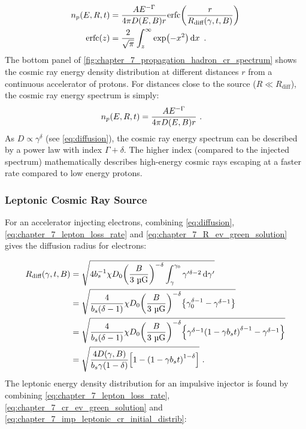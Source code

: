 \begin{equation}
    \begin{aligned}
    n_p\qty(E,R,t)&=\frac{AE^{-\Gamma}}{4\pi D\qty(E,B)r}\text{erfc}\qty(\frac{r}{R_\text{diff}\qty(\gamma,t,B)}) \\
    \text{erfc}\qty(z)&=\frac{2}{\sqrt{\pi}}\int_z^\infty \exp(-x^2)\dd{x}\text{ .}
    \end{aligned} \label{eq:chapter_7_crpropev_hadronic_continuous}
\end{equation}
\noindent The bottom panel of \autoref{fig:chapter_7_propagation_hadron_cr_spectrum} shows the cosmic ray energy density distribution at different distances $r$ from a continuous accelerator of protons. For distances close to the source ($R\ll R_\text{diff}$), the cosmic ray energy spectrum is simply:
\begin{equation}
    \begin{aligned}
 	   n_p\qty(E,R,t)&=\frac{AE^{-\Gamma}}{4\pi D\qty(E,B)r}\text{ .}
    \end{aligned} 
\end{equation}
\noindent As $D\propto \gamma^{\delta}$ (see \autoref{eq:diffusion}), the cosmic ray energy spectrum can be described by a power law with index $\Gamma+\delta$. The higher index (compared to the injected spectrum) mathematically describes high-energy cosmic rays escaping at a faster rate compared to low energy protons.

\subsubsection{Leptonic Cosmic Ray Source}

For an accelerator injecting electrons, combining \autoref{eq:diffusion},  \autoref{eq:chapter_7_lepton_loss_rate} and \autoref{eq:chapter_7_R_ev_green_solution} gives the diffusion radius for electrons:

\begin{equation}
	\begin{aligned}
		R_\text{diff}\qty(\gamma,t,B)&=\sqrt{4b_s^{-1} \chi D_0\qty(\frac{B}{3~\si{\micro G}})^{-\delta}\int_\gamma^{\gamma_0}\gamma'^{\delta-2}\dd{\gamma'}} \\
		&=\sqrt{\frac{4}{b_s(\delta-1)} \chi D_0\qty(\frac{B}{3~\si{\micro G}})^{-\delta} \qty{\gamma_0^{\delta-1}-\gamma^{\delta-1}} } \\
		&=\sqrt{\frac{4}{b_s(\delta-1)} \chi D_0\qty(\frac{B}{3~\si{\micro G}})^{-\delta} \qty{\gamma^{\delta-1}\qty(1-\gamma b_st)^{\delta-1}-\gamma^{\delta-1}} } \\
		&=\sqrt{\frac{4D\qty(\gamma,B)}{b_s\gamma\qty(1-\delta)}\qty[1-\qty(1-\gamma b_s t)^{1-\delta}]}\text{ .}
	\end{aligned} \label{eq:chapter_7_Rdiff_leptonic_impulsive}
\end{equation} 
\noindent The leptonic energy density distribution for an impulsive injector is found by combining \autoref{eq:chapter_7_lepton_loss_rate}, \autoref{eq:chapter_7_cr_ev_green_solution} and \autoref{eq:chapter_7_imp_leptonic_cr_initial_distrib}:

